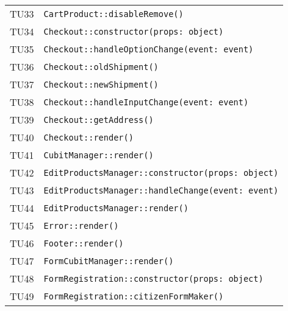 \begin{longtable}{ >{\centering}p{} >{}p{}}
			\hypertarget{TU33}{TU33} & 
			\texttt{CartProduct::disableRemove()}\\
			
			\hypertarget{TU34}{TU34} & 
			\texttt{Checkout::constructor(props: object)}\\
			
			\hypertarget{TU35}{TU35} & 
			\texttt{Checkout::handleOptionChange(event: event)}\\
			
			\hypertarget{TU36}{TU36} & 
			\texttt{Checkout::oldShipment()}\\
			
			\hypertarget{TU37}{TU37} & 
			\texttt{Checkout::newShipment()}\\
			
			\hypertarget{TU38}{TU38} & 
			\texttt{Checkout::handleInputChange(event: event)}\\
			
			\hypertarget{TU39}{TU39} & 
			\texttt{Checkout::getAddress()}\\
			
			\hypertarget{TU40}{TU40} & 
			\texttt{Checkout::render()}\\
			
			\hypertarget{TU41}{TU41} & 
			\texttt{CubitManager::render()}\\
			
			\hypertarget{TU42}{TU42} & 
			\texttt{EditProductsManager::constructor(props: object)}\\
			
			\hypertarget{TU43}{TU43} & 
			\texttt{EditProductsManager::handleChange(event: event)}\\
			
			\hypertarget{TU44}{TU44} & 
			\texttt{EditProductsManager::render()}\\
			
			\hypertarget{TU45}{TU45} & 
			\texttt{Error::render()}\\
			
			\hypertarget{TU46}{TU46} & 
			\texttt{Footer::render()}\\
			
			\hypertarget{TU47}{TU47} & 
			\texttt{FormCubitManager::render()}\\
			
			\hypertarget{TU48}{TU48} & 
			\texttt{FormRegistration::constructor(props: object)}\\
			
			\hypertarget{TU49}{TU49} & 
			\texttt{FormRegistration::citizenFormMaker()}\\
			

\end{longtable}
